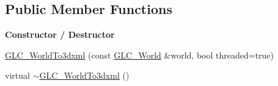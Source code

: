 \subsection*{Public Member Functions}
\begin{Indent}{\bf Constructor / Destructor}\par
\begin{DoxyCompactItemize}
\item 
\hyperlink{class_g_l_c___world_to3dxml_ac9c6fd38be043be4a183b52183e91d4a}{G\-L\-C\-\_\-\-World\-To3dxml} (const \hyperlink{class_g_l_c___world}{G\-L\-C\-\_\-\-World} \&world, bool threaded=true)
\item 
virtual \hyperlink{class_g_l_c___world_to3dxml_aa70a9579476538a948473fa0a2f68585}{$\sim$\-G\-L\-C\-\_\-\-World\-To3dxml} ()
\end{DoxyCompactItemize}
\end{Indent}
